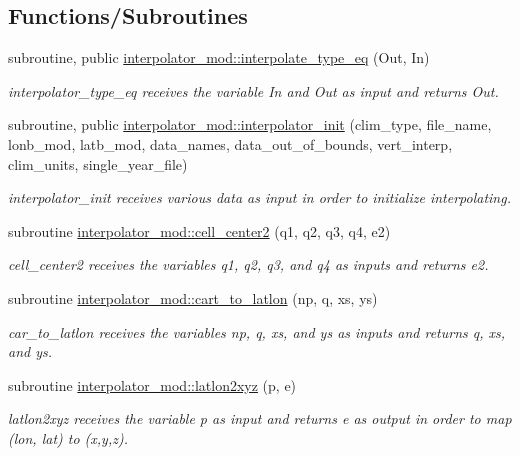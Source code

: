 \subsection*{Functions/\+Subroutines}
\begin{DoxyCompactItemize}
\item 
subroutine, public \hyperlink{namespaceinterpolator__mod_a19abcf7938596e9a635bb58a0fe48deb}{interpolator\+\_\+mod\+::interpolate\+\_\+type\+\_\+eq} (Out, In)
\begin{DoxyCompactList}\small\item\em interpolator\+\_\+type\+\_\+eq receives the variable In and Out as input and returns Out. \end{DoxyCompactList}\item 
subroutine, public \hyperlink{namespaceinterpolator__mod_a8613c8850b935b6b95be55b6c250d64a}{interpolator\+\_\+mod\+::interpolator\+\_\+init} (clim\+\_\+type, file\+\_\+name, lonb\+\_\+mod, latb\+\_\+mod, data\+\_\+names, data\+\_\+out\+\_\+of\+\_\+bounds, vert\+\_\+interp, clim\+\_\+units, single\+\_\+year\+\_\+file)
\begin{DoxyCompactList}\small\item\em interpolator\+\_\+init receives various data as input in order to initialize interpolating. \end{DoxyCompactList}\item 
subroutine \hyperlink{namespaceinterpolator__mod_a444568a0a574084630d91b8da59f3bc5}{interpolator\+\_\+mod\+::cell\+\_\+center2} (q1, q2, q3, q4, e2)
\begin{DoxyCompactList}\small\item\em cell\+\_\+center2 receives the variables q1, q2, q3, and q4 as inputs and returns e2. \end{DoxyCompactList}\item 
subroutine \hyperlink{namespaceinterpolator__mod_a6d7828eb74252f340328684ae223f785}{interpolator\+\_\+mod\+::cart\+\_\+to\+\_\+latlon} (np, q, xs, ys)
\begin{DoxyCompactList}\small\item\em car\+\_\+to\+\_\+latlon receives the variables np, q, xs, and ys as inputs and returns q, xs, and ys. \end{DoxyCompactList}\item 
subroutine \hyperlink{namespaceinterpolator__mod_af262b3bf80a5aa9610024f74c8958c01}{interpolator\+\_\+mod\+::latlon2xyz} (p, e)
\begin{DoxyCompactList}\small\item\em latlon2xyz receives the variable p as input and returns e as output in order to map (lon, lat) to (x,y,z). \end{DoxyCompactList}\item 

\end{DoxyCompactItemize}
